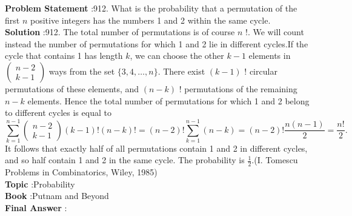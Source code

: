 \documentclass[10pt]{article}
\begin{document}
\textbf{Problem Statement} :912. What is the probability that a permutation of the first $n$ positive integers has the numbers 1 and 2 within the same cycle.\\
\textbf{Solution} :912. The total number of permutations is of course $n$ !. We will count instead the number of permutations for which 1 and 2 lie in different cycles.If the cycle that contains 1 has length $k$, we can choose the other $k-1$ elements in $\left(\begin{array}{c}n-2 \\ k-1\end{array}\right)$ ways from the set $\{3,4, \ldots, n\}$. There exist $(k-1)$ ! circular permutations of these elements, and $(n-k)$ ! permutations of the remaining $n-k$ elements. Hence the total number of permutations for which 1 and 2 belong to different cycles is equal to$$ \sum_{k=1}^{n-1}\left(\begin{array}{l} n-2 \\ k-1 \end{array}\right)(k-1) !(n-k) !=(n-2) ! \sum_{k=1}^{n-1}(n-k)=(n-2) ! \frac{n(n-1)}{2}=\frac{n !}{2} . $$It follows that exactly half of all permutations contain 1 and 2 in different cycles, and so half contain 1 and 2 in the same cycle. The probability is $\frac{1}{2}$.(I. Tomescu Problems in Combinatorics, Wiley, 1985)\\
\textbf{Topic} :Probability\\
\textbf{Book} :Putnam and Beyond\\
\textbf{Final Answer} :\\
\end{document}
